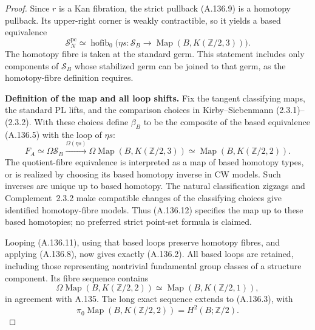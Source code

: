 \begin{proof}
Since $r$ is a Kan fibration, the strict pullback (A.136.9) is a
homotopy pullback. Its upper-right corner is weakly contractible,
so it yields a based equivalence
\[
 \mathcal S_N^{\mathrm{pc}}
 \simeq\operatorname{hofib}_0
 \bigl(\eta s:\mathcal S_B\longrightarrow
 \operatorname{Map}(B,K(\mathbb Z/2,3))\bigr).            \tag{A.136.11}
\]
The homotopy fibre is taken at the standard germ. This statement
includes only components of $\mathcal S_B$ whose stabilized germ
can be joined to that germ, as the homotopy-fibre definition requires.

\textbf{Definition of the map and all loop shifts.}
Fix the tangent classifying maps, the standard PL lifts, and the
comparison choices in Kirby--Siebenmann (2.3.1)--(2.3.2). With these
choices define $\beta_B$ to be the composite of the based equivalence
(A.136.5) with the loop of $\eta s$:
\[
 F_A\simeq\Omega\mathcal S_B
 \xrightarrow{\Omega(\eta s)}
 \Omega\operatorname{Map}(B,K(\mathbb Z/2,3))
 \simeq\operatorname{Map}(B,K(\mathbb Z/2,2)).            \tag{A.136.12}
\]
The quotient-fibre equivalence is interpreted as a map of based
homotopy types, or is realized by choosing its based homotopy inverse
in CW models. Such inverses are unique up to based homotopy.
The natural classification zigzags and Complement~2.3.2 make
compatible changes of the classifying choices give identified
homotopy-fibre models. Thus (A.136.12) specifies the map up to these
based homotopies; no preferred strict point-set formula is claimed.

Looping (A.136.11), using that based loops preserve homotopy fibres,
and applying (A.136.8), now gives exactly (A.136.2). All based loops
are retained, including those representing nontrivial fundamental
group classes of a structure component. Its fibre sequence contains
\[
 \Omega\operatorname{Map}(B,K(\mathbb Z/2,2))
 \simeq\operatorname{Map}(B,K(\mathbb Z/2,1)),
\]
in agreement with A.135. The long exact sequence extends to
(A.136.3), with
\[
 \pi_0\operatorname{Map}(B,K(\mathbb Z/2,2))
       =H^2(B;\mathbb Z/2).
\]


\end{proof}
